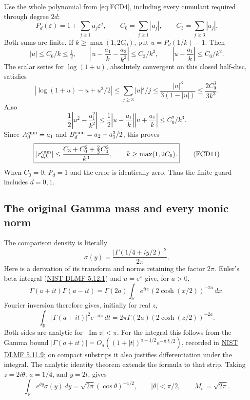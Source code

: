 \documentclass[11pt]{article}
\begin{document}
Use the whole polynomial from \eqref{eq:FCD4}, including every
cumulant required through degree \(2d\):
\[
 P_d(\varepsilon)=1+\sum_{j\ge1}a_j\varepsilon^j,\qquad
 C_0=\sum_{j\ge1}|a_j|,\qquad C_3=\sum_{j\ge3}|a_j|.
\]
Both sums are finite. If \(k\ge\max(1,2C_0)\), put
\(u=P_d(1/k)-1\). Then
\[
 |u|\le C_0/k\le\tfrac12,\qquad
 \left|u-\frac{a_1}k-\frac{a_2}{k^2}\right|
       \le C_3/k^3,\qquad
 \left|u-\frac{a_1}k\right|\le C_0/k^2 .
\]
The scalar series for \(\log(1+u)\), absolutely convergent on this
closed half-disc, satisfies
\[
 |\log(1+u)-u+u^2/2|
   \le\sum_{j\ge3}|u|^j/j
   \le\frac{|u|^3}{3(1-|u|)}
   \le\frac{2C_0^3}{3k^3}.
\]
Also
\[
 \frac12\left|u^2-\frac{a_1^2}{k^2}\right|
 \le\frac12\left|u-\frac{a_1}k\right|
                  \left|u+\frac{a_1}k\right|
 \le C_0^2/k^3 .
\]
Since \(A_d^{\rm cum}=a_1\) and
\(B_d^{\rm cum}=a_2-a_1^2/2\), this proves
\begin{equation}
 \boxed{\displaystyle
 |r_{d,k}^{\rm cum}|
 \le \frac{C_3+C_0^2+\tfrac23 C_0^3}{k^3},
 \qquad k\ge\max(1,2C_0).}
 \tag{FCD11}\label{eq:FCD11}
\end{equation}
When \(C_0=0\), \(P_d=1\) and the error is identically zero.
Thus the finite guard includes \(d=0,1\).

\subsection{The original Gamma mass and every monic norm}

The comparison density is literally
\[
 \sigma(y)=\frac{|\Gamma(1/4+iy/2)|^2}{2\pi}.
\]
Here is a derivation of its transform and norms retaining the factor
\(2\pi\). Euler's beta integral
(\href{https://dlmf.nist.gov/5.12.E1}{NIST DLMF 5.12.1})
and \(u=e^x\) give, for \(a>0\),
\[
 \Gamma(a+it)\Gamma(a-it)
   =\Gamma(2a)\int_{\mathbb R}
           e^{itx}(2\cosh(x/2))^{-2a}\,dx.
\]
Fourier inversion therefore gives, initially for real \(z\),
\[
 \int_{\mathbb R}|\Gamma(a+it)|^2e^{-itz}\,dt
        =2\pi\Gamma(2a)(2\cosh(z/2))^{-2a}.
\]
Both sides are analytic for \(|\operatorname{Im}z|<\pi\).
For the integral this follows from the Gamma bound
\(|\Gamma(a+it)|=O_a((1+|t|)^{a-1/2}e^{-\pi|t|/2})\),
recorded in
\href{https://dlmf.nist.gov/5.11.E9}{NIST DLMF 5.11.9};
on compact substrips it also justifies differentiation under the integral.
The analytic identity theorem extends the formula to that strip.
Taking \(z=2i\theta\), \(a=1/4\), and \(y=2t\), gives
\begin{equation}
 \int_{\mathbb R}e^{\theta y}\sigma(y)\,dy
       =\sqrt{2\pi}(\cos\theta)^{-1/2},\qquad
 |\theta|<\pi/2,\qquad M_\sigma=\sqrt{2\pi}.
 \tag{FCD12}\label{eq:FCD12}
\end{equation}
\end{document}
